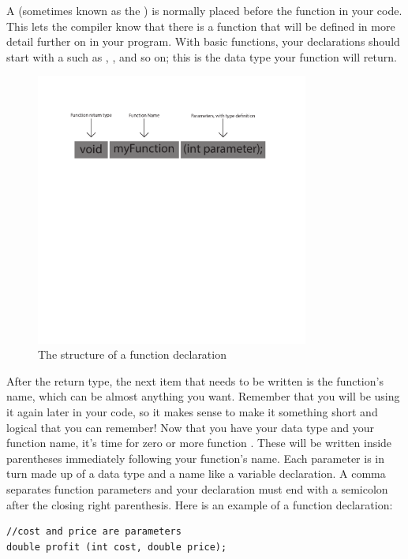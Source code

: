 A  (sometimes known as the ) is normally placed before the  function in your code. 
This lets the compiler know that there is a function that will be defined in more detail further on in your program. 
With basic functions, your declarations should start with a  such as , , and so on; this is the data type your function will return. 

\begin{figure}[tb]
  \centering
  \includegraphics[width=0.8\textwidth]{diagrams/function_structure_diagram_1.pdf}
  \caption{The structure of a function declaration} \label{fig:function_structure_diagram_1} 
\end{figure}

After the return type, the next item that needs to be written is the function's name, which can be almost anything you want. 
Remember that you will be using it again later in your code, so it makes sense to make it something short and logical that you can remember! 
Now that you have your data type and your function name, it's time for zero or more function . 
These will be written inside parentheses immediately following your function's name. 
Each parameter is in turn made up of a data type and a name like a variable declaration. 
A comma separates function parameters and your declaration must end with a semicolon after the closing right parenthesis. Here is an example of a function declaration:

\noindent\begin{minipage}{\linewidth}\begin{lstlisting}
//cost and price are parameters
double profit (int cost, double price); 
\end{lstlisting}\end{minipage}
        	

